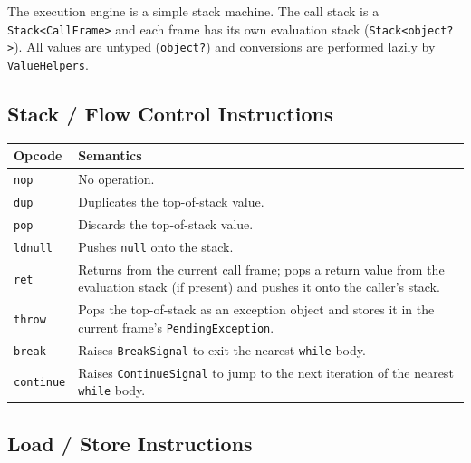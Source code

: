 \documentclass[11pt,a4paper]{article}
\newcommand{\code}[1]{\texttt{\small #1}}
\newcommand{\typename}[1]{\textcolor{typecolor}{\texttt{\small #1}}}
\begin{document}
The execution engine is a simple stack machine. The call stack is a
\code{Stack<CallFrame>} and each frame has its own evaluation stack
(\code{Stack<object?>}). All values are untyped (\code{object?}) and conversions are
performed lazily by \typename{ValueHelpers}.

\subsection{Stack / Flow Control Instructions}

\begin{longtable}{lp{10cm}}
  \toprule
  \textbf{Opcode} & \textbf{Semantics} \\
  \midrule
  \endhead
  \code{nop}      & No operation. \\
  \code{dup}      & Duplicates the top-of-stack value. \\
  \code{pop}      & Discards the top-of-stack value. \\
  \code{ldnull}   & Pushes \code{null} onto the stack. \\
  \code{ret}      & Returns from the current call frame; pops a return value from the
                    evaluation stack (if present) and pushes it onto the caller's stack. \\
  \code{throw}    & Pops the top-of-stack as an exception object and stores it in the
                    current frame's \code{PendingException}. \\
  \code{break}    & Raises \typename{BreakSignal} to exit the nearest \code{while} body. \\
  \code{continue} & Raises \typename{ContinueSignal} to jump to the next iteration of
                    the nearest \code{while} body. \\
  \bottomrule
\end{longtable}

\subsection{Load / Store Instructions}
\end{document}

